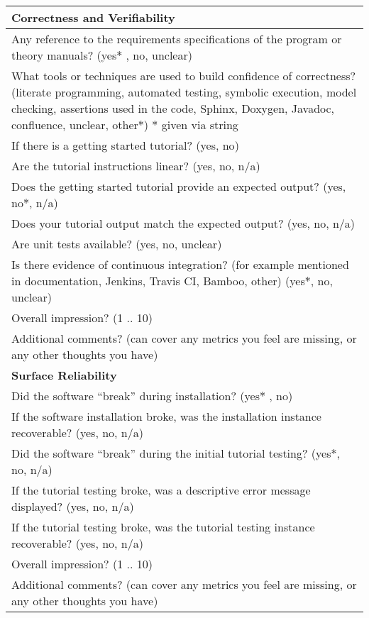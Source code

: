 \begin{table}[H]
\centering
\begin{tabular}{p{14cm}}
\hline		
\textbf{Correctness and Verifiability}\\
\hline
Any reference to the requirements specifications of the program or theory manuals? ({yes$\ast$ , no, unclear})\\
What tools or techniques are used to build confidence of correctness? ({literate programming, automated testing, symbolic execution, model checking, assertions used in the code, Sphinx, Doxygen, Javadoc, confluence, unclear, other$\ast$}) $\ast$ given via string\\
If there is a getting started tutorial? ({yes, no})\\
Are the tutorial instructions linear? ({yes, no, n/a})\\
Does the getting started tutorial provide an expected output? ({yes, no$\ast$, n/a})\\
Does your tutorial output match the expected output? ({yes, no, n/a})\\
Are unit tests available?  ({yes, no, unclear})\\
Is there evidence of continuous integration? (for example mentioned in documentation, Jenkins, Travis CI, Bamboo, other) ({yes$\ast$, no, unclear})\\
Overall impression? ({1 .. 10})\\
Additional comments? (can cover any metrics you feel are missing, or any other thoughts you have) \\
\hline	
\textbf{Surface Reliability}\\
\hline
Did the software “break” during installation? ({yes$\ast$ , no})\\
If the software installation broke, was the installation instance recoverable? ({yes, no, n/a})\\
Did the software “break” during the initial tutorial testing? ({yes$\ast$, no, n/a})\\
If the tutorial testing broke, was a descriptive error message displayed? ({yes, no, n/a})\\
If the tutorial testing broke, was the tutorial testing instance recoverable? ({yes, no, n/a})\\
Overall impression? ({1 .. 10})\\
Additional comments? (can cover any metrics you feel are missing, or any other thoughts you have)\\
\hline		
\end{tabular}
\end{table}

